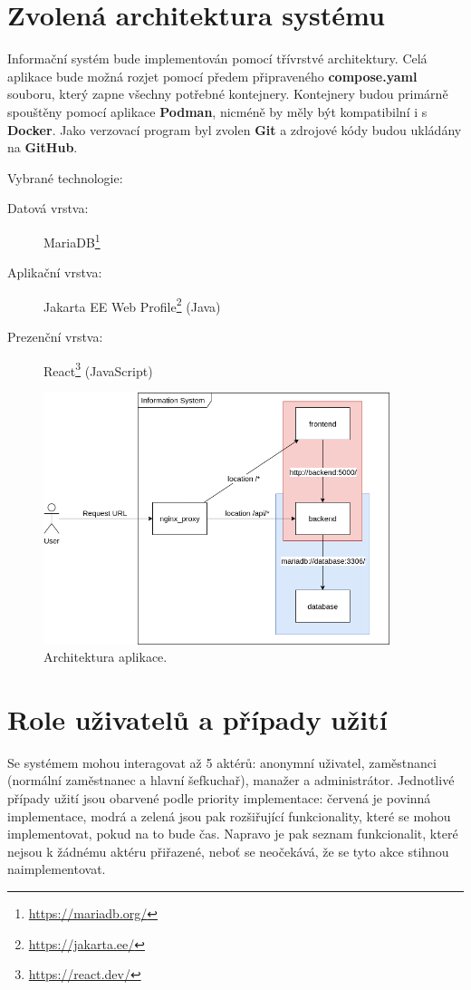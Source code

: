 \documentclass[a4paper]{article}
\begin{document}
\newpage

\section{Zvolená architektura systému}
Informační systém bude implementován pomocí třívrstvé architektury. Celá aplikace bude
možná rozjet pomocí předem připraveného \textbf{compose.yaml} souboru, který zapne
všechny potřebné kontejnery. Kontejnery budou primárně spouštěny pomocí aplikace
\textbf{Podman}, nicméně by měly být kompatibilní i s \textbf{Docker}. Jako verzovací
program byl zvolen \textbf{Git} a zdrojové kódy budou ukládány na \textbf{GitHub}.

Vybrané technologie:

\begin{description}
    \item [Datová vrstva:]       MariaDB\footnote{\url{https://mariadb.org/}}
    \item [Aplikační vrstva:]    Jakarta EE Web Profile\footnote{\url{https://jakarta.ee/}} (Java)
    \item [Prezenční vrstva:]    React\footnote{\url{https://react.dev/}} (JavaScript)
\end{description}

\begin{figure}[ht]
    \centering
    \includegraphics[width=0.9\textwidth]{arch.png}
    \caption{Architektura aplikace.}
\end{figure}

\newpage
\section{Role uživatelů a případy užití}
Se systémem mohou interagovat až 5 aktérů: anonymní uživatel, zaměstnanci (normální zaměstnanec
a hlavní šefkuchař), manažer a administrátor. Jednotlivé případy užití jsou obarvené
podle priority implementace: červená je povinná implementace, modrá a zelená jsou pak
rozšiřující funkcionality, které se mohou implementovat, pokud na to bude čas. Napravo je
pak seznam funkcionalit, které nejsou k žádnému aktéru přiřazené, neboť se neočekává, že
se tyto akce stihnou naimplementovat.
\end{document}
